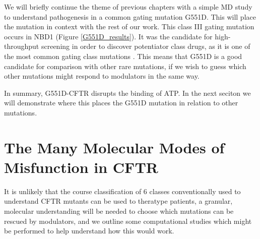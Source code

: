 We will briefly continue the theme of previous chapters with a simple MD study to understand pathogenesis in a common gating mutation G551D. This will place the mutation in context with the rest of our work. This class III gating mutation occurs in NBD1 (Figure \ref{G551D_results}). It was the candidate for high-throughput screening in order to discover potentiator class drugs, as it is one of the most common gating class mutations \cite{vangoor2009,li1996}. This means that G551D is a good candidate for comparison  with other rare mutations, if we wish to guess which other mutations might respond to modulators in the same way.

In summary, G551D-CFTR disrupts the binding of ATP. In the next seciton we will demonstrate where this places the G551D mutation in relation to other mutations. 

\section{The Many Molecular Modes of Misfunction in CFTR}
It is unlikely that the course classification of 6 classes conventionally used to understand CFTR mutants can be used to theratype patients, a granular, molecular understanding will be needed to choose which mutations can be rescued by modulators, and we outline some computational studies which might be performed to help understand how this would work.

